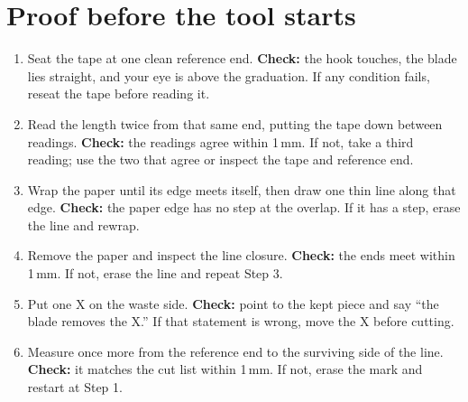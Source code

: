 \section{Proof before the tool starts}
\begin{center}
\end{center}

\begin{enumerate}
\item Seat the tape at one clean reference end. \textbf{Check:} the hook touches,
the blade lies straight, and your eye is above the graduation. If any condition
fails, reseat the tape before reading it.
\item Read the length twice from that same end, putting the tape down between
readings. \textbf{Check:} the readings agree within 1\,mm. If not, take a third
reading; use the two that agree or inspect the tape and reference end.
\item Wrap the paper until its edge meets itself, then draw one thin line along
that edge. \textbf{Check:} the paper edge has no step at the overlap. If it has
a step, erase the line and rewrap.
\item Remove the paper and inspect the line closure. \textbf{Check:} the ends
meet within 1\,mm. If not, erase the line and repeat Step 3.
\item Put one X on the waste side. \textbf{Check:} point to the kept piece and
say ``the blade removes the X.'' If that statement is wrong, move the X before
cutting.
\item Measure once more from the reference end to the surviving side of the
line. \textbf{Check:} it matches the cut list within 1\,mm. If not, erase the
mark and restart at Step 1.
\end{enumerate}

